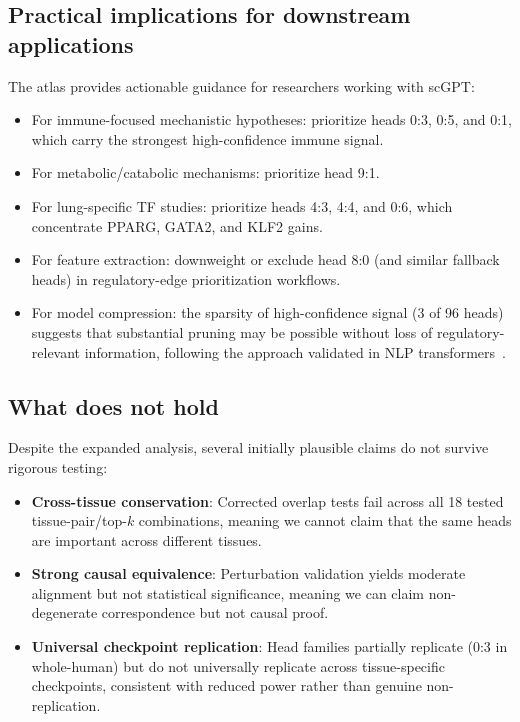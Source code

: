 \documentclass[11pt]{article}
\begin{document}
\subsection{Practical implications for downstream applications}
The atlas provides actionable guidance for researchers working with scGPT:

\begin{itemize}
\item For immune-focused mechanistic hypotheses: prioritize heads 0:3, 0:5, and 0:1, which carry the strongest high-confidence immune signal.
\item For metabolic/catabolic mechanisms: prioritize head 9:1.
\item For lung-specific TF studies: prioritize heads 4:3, 4:4, and 0:6, which concentrate PPARG, GATA2, and KLF2 gains.
\item For feature extraction: downweight or exclude head 8:0 (and similar fallback heads) in regulatory-edge prioritization workflows.
\item For model compression: the sparsity of high-confidence signal (3 of 96 heads) suggests that substantial pruning may be possible without loss of regulatory-relevant information, following the approach validated in NLP transformers~\cite{voita2019heads,michel2019sixteen}.
\end{itemize}

\subsection{What does not hold}
Despite the expanded analysis, several initially plausible claims do not survive rigorous testing:

\begin{itemize}
\item \textbf{Cross-tissue conservation}: Corrected overlap tests fail across all 18 tested tissue-pair/top-$k$ combinations, meaning we cannot claim that the same heads are important across different tissues.
\item \textbf{Strong causal equivalence}: Perturbation validation yields moderate alignment but not statistical significance, meaning we can claim non-degenerate correspondence but not causal proof.
\item \textbf{Universal checkpoint replication}: Head families partially replicate (0:3 in whole-human) but do not universally replicate across tissue-specific checkpoints, consistent with reduced power rather than genuine non-replication.
\end{itemize}
\end{document}

